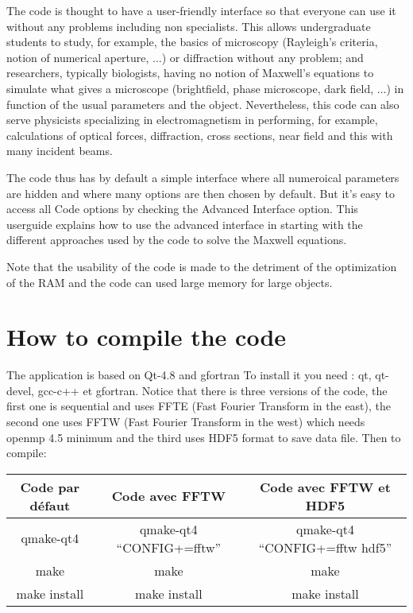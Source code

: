 The code is thought to have a user-friendly interface so that everyone
can use it without any problems including non specialists. This allows
undergraduate students to study, for example, the basics of microscopy
(Rayleigh's criteria, notion of numerical aperture, ...)  or
diffraction without any problem; and researchers, typically
biologists, having no notion of Maxwell's equations to simulate what
gives a microscope (brightfield, phase microscope, dark field, ...) in
function of the usual parameters and the object. Nevertheless, this
code can also serve physicists specializing in electromagnetism in
performing, for example, calculations of optical forces, diffraction,
cross sections, near field and this with many incident beams.

The code thus has by default a simple interface where all numeroical
parameters are hidden and where many options are then chosen by
default. But it's easy to access all Code options by checking the
Advanced Interface option. This userguide explains how to use the
advanced interface in starting with the different approaches used by
the code to solve the Maxwell equations.

Note that the usability of the code is made to the detriment of the
optimization of the RAM and the code can used large memory for large
objects.


\section{How to compile the code}

The application is based on Qt-4.8 and gfortran To install it you need
: qt, qt-devel, gcc-c++ et gfortran.  Notice that there is three
versions of the code, the first one is sequential and uses FFTE (Fast
Fourier Transform in the east), the second one uses FFTW (Fast Fourier
Transform in the west) which needs openmp 4.5 minimum and the third
uses HDF5 format to save data file. Then to compile:

\begin{tabular}{|c|c|c|}
  \hline
  Code par défaut & Code avec FFTW & Code avec FFTW et HDF5 \\
  \hline
  qmake-qt4 & qmake-qt4 ``CONFIG+=fftw'' & qmake-qt4 ``CONFIG+=fftw hdf5'' \\
  make & make & make \\
make install & make install & make install \\
  \hline
\end{tabular}

